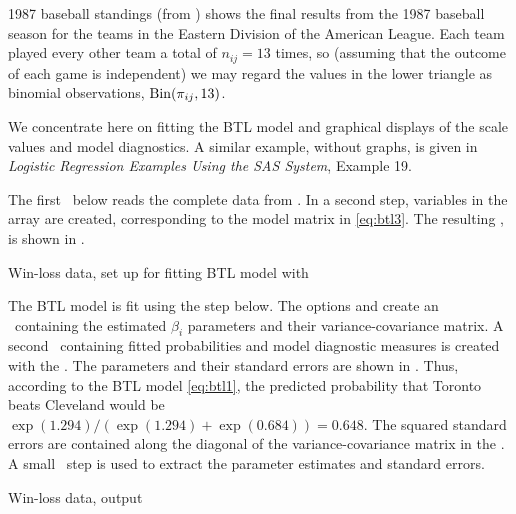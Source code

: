 \begin{Example}[winloss]{1987 baseball standings}
 (from \citet[p. 372]{Agresti:90}) shows the
final results from the 1987 baseball season for the teams in the Eastern Division
of the American League.
Each team played every other team a total of $n_{ij} = 13$ times,
so (assuming that the outcome of each game is independent)
we may regard the values in the lower triangle
as binomial observations, $\Bin( \pi_{ij}, 13 )$.


We concentrate here on fitting the BTL model and graphical displays of
the scale values and model diagnostics.
A similar example, without graphs, is given in
\emph{Logistic Regression Examples Using the SAS System}, Example 19.

The first \Dstp\ below reads the complete data from .
In a second step, variables in the array  are created, corresponding
to the model matrix in \eqref{eq:btl3}.
The resulting \Dset,  is shown in .


\begin{Output}[!htb]
\caption{Win-loss data, set up for fitting BTL model with }\label{out:btl2.1}
\small

\end{Output}
The BTL model is fit using the  step below.
The options  and  create an \ODS\
containing the estimated $\beta_i$ parameters and their
variance-covariance matrix.
A second \ODS\ containing fitted probabilities and model diagnostic
measures is created with the \stmt{OUTPUT}{LOGISTIC}.
The parameters and their standard errors are shown in .
Thus, according to the BTL model \eqref{eq:btl1},
the predicted probability that Toronto beats Cleveland would be
$\exp(1.294)/(\exp(1.294) + \exp(0.684)) = 0.648$.
The squared standard errors are contained along the diagonal of the
variance-covariance matrix in the \pname{PARM1} \Dset.
A small \IML\ step is used to extract the parameter estimates and
standard errors.

\begin{Output}[htb]
\caption{Win-loss data,  output}\label{out:btl2.2}
\small

\end{Output}


\end{Example}
